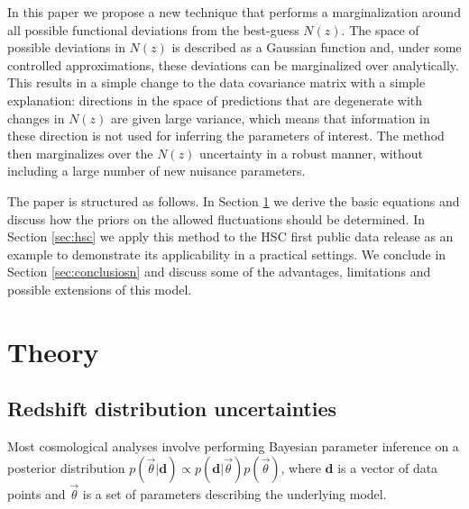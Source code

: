 \documentclass[a4paper,11pt]{article}
\newcommand{\vd}{\mathbf{d}}
\begin{document}
    In this paper we propose a new technique that performs a marginalization around all possible functional deviations from the best-guess $N(z)$. The space of possible deviations in $N(z)$ is described as a Gaussian function and, under some controlled approximations, these deviations can be marginalized over analytically. This results in a simple change to the data covariance matrix with a simple explanation: directions in the space of predictions that are degenerate with changes in $N(z)$ are given large variance, which means that information in these direction is not used for inferring the parameters of interest. The method then marginalizes over the $N(z)$ uncertainty in a robust manner, without including a large number of new nuisance parameters.

    The paper is structured as follows. In Section \ref{sec:theory} we derive the basic equations and discuss how the priors on the allowed fluctuations should be determined. In Section \ref{sec:hsc} we  apply this method to the HSC first public data release as an example to demonstrate its applicability in a practical settings. We conclude in Section \ref{sec:conclusiosn} and discuss some of the advantages, limitations and possible extensions of this model. 


  \section{Theory}\label{sec:theory}
    \subsection{Redshift distribution uncertainties}\label{ssec:theory.nz}
      Most cosmological analyses involve performing Bayesian parameter inference on a posterior distribution $p(\vec{\theta} |\vd) \propto p(\vd|\vec{\theta}) p(\vec{\theta})$, where $\vd$ is a vector of data points and $\vec{\theta}$ is a set of parameters describing the underlying model.
      
\end{document}
